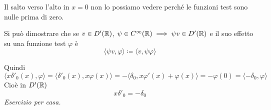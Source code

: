 Il salto verso l'alto in $x = 0$ non lo possiamo vedere perché le funzioni test sono nulle prima di zero.
\Soluzione
\begin{rem}
Si può dimostrare che se $v\in D'(\mathbb{R})$, $\psi \in C^{\infty}(\mathbb{R}) \implies \psi v\in D'(\mathbb{R})$ e il suo effetto su una funzione test $\varphi $ è
\begin{equation*}
\langle \psi v, \varphi \rangle \coloneqq \langle v, \psi \varphi \rangle 
\end{equation*}
\end{rem}
Quindi
\begin{equation*}
\langle x\delta '_{0} (x), \varphi \rangle = \langle \delta '_{0} (x), x\varphi (x) \rangle = - \langle \delta_{0}, x\varphi '(x) + \varphi (x) \rangle = - \varphi (0) = \langle - \delta_{0}, \varphi \rangle 
\end{equation*}
Cioè in $D'(\mathbb{R})$
\begin{equation*}
x\delta '_{0} = - \delta_{0}
\end{equation*}
\textit{Esercizio per casa.}

